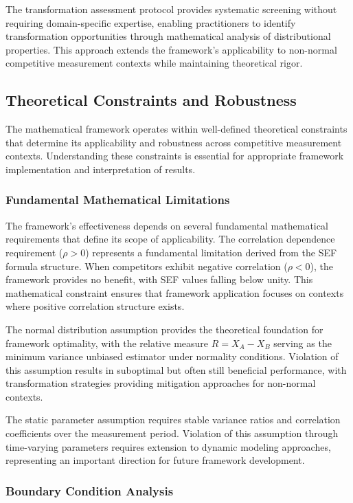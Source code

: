 The transformation assessment protocol provides systematic screening without requiring domain-specific expertise, enabling practitioners to identify transformation opportunities through mathematical analysis of distributional properties. This approach extends the framework's applicability to non-normal competitive measurement contexts while maintaining theoretical rigor.

\subsection{Theoretical Constraints and Robustness}

The mathematical framework operates within well-defined theoretical constraints that determine its applicability and robustness across competitive measurement contexts. Understanding these constraints is essential for appropriate framework implementation and interpretation of results.

\subsubsection{Fundamental Mathematical Limitations}

The framework's effectiveness depends on several fundamental mathematical requirements that define its scope of applicability. The correlation dependence requirement ($\rho > 0$) represents a fundamental limitation derived from the SEF formula structure. When competitors exhibit negative correlation ($\rho < 0$), the framework provides no benefit, with SEF values falling below unity. This mathematical constraint ensures that framework application focuses on contexts where positive correlation structure exists.

The normal distribution assumption provides the theoretical foundation for framework optimality, with the relative measure $R = X_A - X_B$ serving as the minimum variance unbiased estimator under normality conditions. Violation of this assumption results in suboptimal but often still beneficial performance, with transformation strategies providing mitigation approaches for non-normal contexts.

The static parameter assumption requires stable variance ratios and correlation coefficients over the measurement period. Violation of this assumption through time-varying parameters requires extension to dynamic modeling approaches, representing an important direction for future framework development.

\subsubsection{Boundary Condition Analysis}

